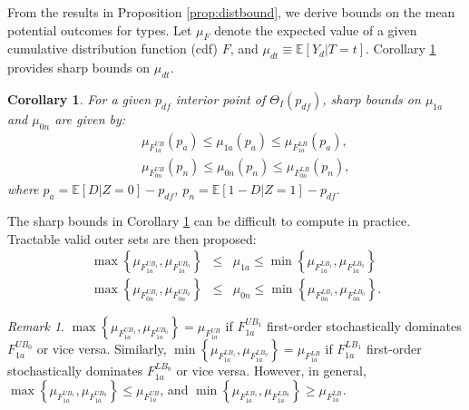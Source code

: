 \documentclass[12pt]{article}
\theoremstyle{plain}
\newtheorem{corollary}{Corollary}%
\theoremstyle{definition}
\theoremstyle{remark}
\newtheorem{remark}{Remark}%
\begin{document}
From the results in Proposition \ref{prop:distbound}, we derive bounds on the mean potential outcomes for types. Let $\mu_F$ denote the expected value of a given cumulative distribution function (cdf) $F$, and $\mu_{dt}\equiv \mathbb E[Y_d \vert T=t]$. Corollary \ref{cor:mubounds} provides sharp bounds on $\mu_{dt}$.    
\begin{corollary}\label{cor:mubounds}
 For a given $p_{df}$ interior point of $\Theta_I(p_{df})$, sharp bounds on $\mu_{1a}$ and $\mu_{0n}$ are given by:
    \begin{eqnarray*}
      && \mu_{F_{1a}^{UB}}(p_a) \leq \mu_{1a}(p_a) \leq \mu_{F_{1a}^{LB}}(p_a),\\
      && \mu_{F_{0n}^{UB}}(p_n) \leq \mu_{0n}(p_n) \leq \mu_{F_{0n}^{LB}}(p_n),
    \end{eqnarray*}
where $p_a=\mathbb{E}[D  \vert  Z=0]-p_{d f}$, $p_n= \mathbb{E}[1-D  \vert  Z=1]-p_{d f}.$ %
\end{corollary}
The sharp bounds in Corollary \ref{cor:mubounds} can be difficult to compute in practice. Tractable valid outer sets are then proposed:
\begin{eqnarray*}
    \max\left\{\mu_{F_{1a}^{UB_1}}, \mu_{F_{1a}^{UB_0}}\right\} &\leq& \mu_{1a} \leq \min\left\{\mu_{F_{1a}^{LB_1}}, \mu_{F_{1a}^{LB_0}}\right\}\\
    \max\left\{\mu_{F_{0n}^{UB_1}}, \mu_{F_{0n}^{UB_0}}\right\} &\leq& \mu_{0n} \leq \min\left\{\mu_{F_{0n}^{LB_1}}, \mu_{F_{0n}^{LB_0}}\right\}.
\end{eqnarray*}

\begin{remark}
    $\max\left\{\mu_{F_{1a}^{UB_1}}, \mu_{F_{1a}^{UB_0}}\right\}=\mu_{F_{1a}^{UB}}$ if $F_{1a}^{UB_1}$ first-order stochastically dominates $F_{1a}^{UB_0}$ or vice versa. Similarly, $\min\left\{\mu_{F_{1a}^{LB_1}}, \mu_{F_{1a}^{LB_0}}\right\}=\mu_{F_{1a}^{LB}}$ if $F_{1a}^{LB_1}$ first-order stochastically dominates $F_{1a}^{LB_0}$ or vice versa. However, in general, 
    $\max\left\{\mu_{F_{1a}^{UB_1}}, \mu_{F_{1a}^{UB_0}}\right\} \leq \mu_{F_{1a}^{UB}}$, and $\min\left\{\mu_{F_{1a}^{LB_1}}, \mu_{F_{1a}^{LB_0}}\right\}\geq \mu_{F_{1a}^{LB}}$. 
\end{remark}
\end{document}
